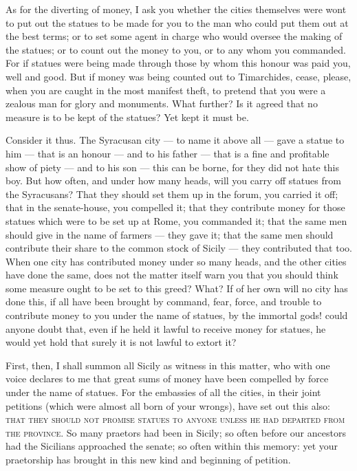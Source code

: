  As for the diverting of money, I ask you whether the cities themselves were wont to put out the statues to be made for you to the man who could put them out at the best terms; or to set some agent in charge who would oversee the making of the statues; or to count out the money to you, or to any whom you commanded. For if statues were being made through those by whom this honour was paid you, well and good. But if money was being counted out to Timarchides, cease, please, when you are caught in the most manifest theft, to pretend that you were a zealous man for glory and monuments. What further? Is it agreed that no measure is to be kept of the statues? Yet kept it must be.

 Consider it thus. The Syracusan city --- to name it above all --- gave a statue to him --- that is an honour --- and to his father --- that is a fine and profitable show of piety --- and to his son --- this can be borne, for they did not hate this boy. But how often, and under how many heads, will you carry off statues from the Syracusans? That they should set them up in the forum, you carried it off; that in the senate-house, you compelled it; that they contribute money for those statues which were to be set up at Rome, you commanded it; that the same men should give in the name of farmers --- they gave it; that the same men should contribute their share to the common stock of Sicily --- they contributed that too. When one city has contributed money under so many heads, and the other cities have done the same, does not the matter itself warn you that you should think some measure ought to be set to this greed? What? If of her own will no city has done this, if all have been brought by command, fear, force, and trouble to contribute money to you under the name of statues, by the immortal gods! could anyone doubt that, even if he held it lawful to receive money for statues, he would yet hold that surely it is not lawful to extort it?

 First, then, I shall summon all Sicily as witness in this matter, who with one voice declares to me that great sums of money have been compelled by force under the name of statues. For the embassies of all the cities, in their joint petitions (which were almost all born of your wrongs), have set out this also: \textsc{that they should not promise statues to anyone unless he had departed from the province}. So many praetors had been in Sicily; so often before our ancestors had the Sicilians approached the senate; so often within this memory: yet your praetorship has brought in this new kind and beginning of petition.

